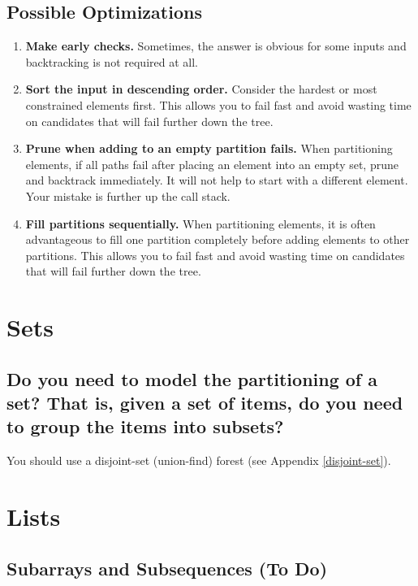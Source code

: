 \documentclass[12pt, titlepage]{article}
\begin{document}
\subsection{Possible Optimizations}

\begin{enumerate}
  \item \textbf{Make early checks.} Sometimes, the answer is obvious for some inputs and backtracking is not required at all.
  \item \textbf{Sort the input in descending order.} Consider the hardest or most constrained elements first. This allows you to fail fast and avoid wasting time on candidates that will fail further down the tree.
  \item \textbf{Prune when adding to an empty partition fails.} When partitioning elements, if all paths fail after placing an element into an empty set, prune and backtrack immediately. It will not help to start with a different element. Your mistake is further up the call stack.
  \item \textbf{Fill partitions sequentially.} When partitioning elements, it is often advantageous to fill one partition completely before adding elements to other partitions. This allows you to fail fast and avoid wasting time on candidates that will fail further down the tree.
\end{enumerate}

\section{Sets}

\subsection{Do you need to model the partitioning of a set? That is, given a set of items, do you need to group the items into subsets?}

You should use a disjoint-set (union-find) forest (see Appendix \ref{disjoint-set}).

\section{Lists}

\subsection{Subarrays and Subsequences (To Do)}
\end{document}
